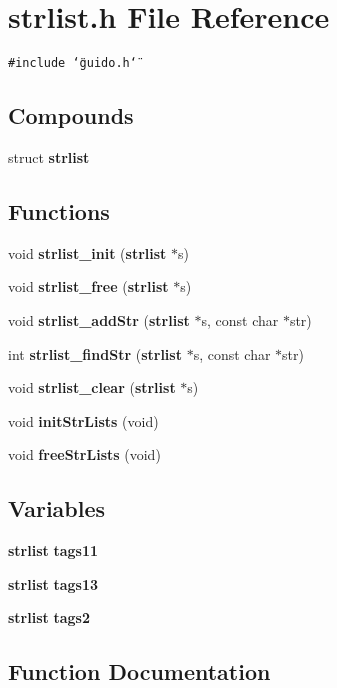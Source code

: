 \section{strlist.h File Reference}
\label{strlist_8h}
{\tt \#include \char`\"{}guido.h\char`\"{}}\par
\subsection*{Compounds}
\begin{CompactItemize}
\item 
struct {\bf strlist}
\end{CompactItemize}
\subsection*{Functions}
\begin{CompactItemize}
\item 
void {\bf strlist\_\-init} ({\bf strlist} $\ast$s)
\item 
void {\bf strlist\_\-free} ({\bf strlist} $\ast$s)
\item 
void {\bf strlist\_\-add\-Str} ({\bf strlist} $\ast$s, const char $\ast$str)
\item 
int {\bf strlist\_\-find\-Str} ({\bf strlist} $\ast$s, const char $\ast$str)
\item 
void {\bf strlist\_\-clear} ({\bf strlist} $\ast$s)
\item 
void {\bf init\-Str\-Lists} (void)
\item 
void {\bf free\-Str\-Lists} (void)
\end{CompactItemize}
\subsection*{Variables}
\begin{CompactItemize}
\item 
{\bf strlist} {\bf tags11}
\item 
{\bf strlist} {\bf tags13}
\item 
{\bf strlist} {\bf tags2}
\end{CompactItemize}


\subsection{Function Documentation}
